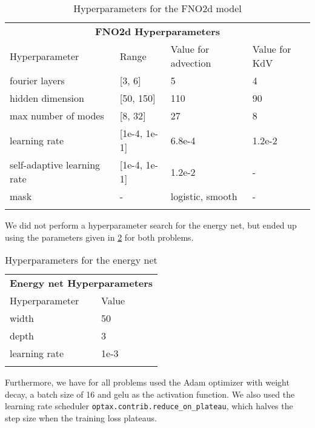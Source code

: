 \begin{table}[h]
    \centering
    \caption{Hyperparameters for the FNO2d model}
    \begin{tabular}{@{}llll@{}}
    \multicolumn{4}{c}{\textbf{FNO2d Hyperparameters}} \\  %
    \cmidrule(r){1-4}  %
    Hyperparameter & Range & Value for advection & Value for KdV \\
    \midrule
    fourier layers & [3, 6] & 5 & 4 \\
    hidden dimension & [50, 150] & 110 & 90 \\
    max number of modes & [8, 32] & 27 & 8 \\
    learning rate & [1e-4, 1e-1] & 6.8e-4 & 1.2e-2\\
    self-adaptive learning rate & [1e-4, 1e-1] & 1.2e-2 & -\\
    mask & - & logistic, smooth & - \\
    \label{tab:hyperparameter_search_space_fno2d}
    \end{tabular}
\end{table}

We did not perform a hyperparameter search for the energy net, but ended up using the parameters given in \cref{tab:hyperparameter_search_space_energy_net} for both problems.

\begin{table}[h]
    \centering
    \caption{Hyperparameters for the energy net}
    \begin{tabular}{@{}llll@{}}
    \multicolumn{4}{c}{\textbf{Energy net Hyperparameters}} \\  %
    \cmidrule(r){1-4}  %
    Hyperparameter &  Value \\
    \midrule
    width & 50 \\
    depth & 3 \\
    learning rate & 1e-3 \\
    \label{tab:hyperparameter_search_space_energy_net}
    \end{tabular}
\end{table}

Furthermore, we have for all problems used the Adam optimizer with weight decay, a batch size of 16 and gelu as the activation function.
We also used the learning rate scheduler \texttt{optax.contrib.reduce\_on\_plateau}, which halves the step size when the training loss plateaus.

